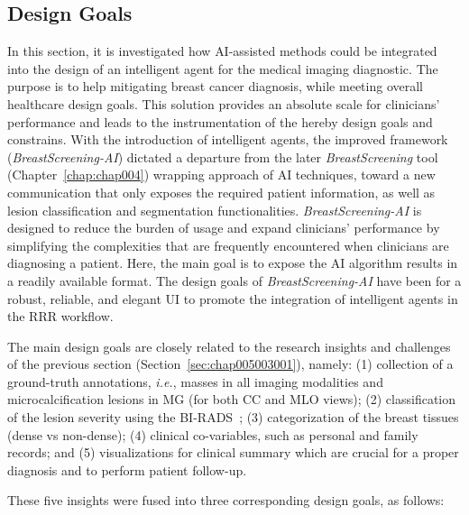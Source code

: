 \subsection{Design Goals}
\label{sec:chap005003002}

In this section, it is investigated how \ac{AI}-assisted methods could be integrated into the design of an intelligent agent for the medical imaging diagnostic.
The purpose is to help mitigating breast cancer diagnosis, while meeting overall healthcare design goals.
This solution provides an absolute scale for clinicians' performance and leads to the instrumentation of the hereby design goals and constrains.
With the introduction of intelligent agents, the improved framework ({\it BreastScreening-AI}) dictated a departure from the later {\it BreastScreening} tool (Chapter~\ref{chap:chap004}) wrapping approach of \ac{AI} techniques, toward a new communication that only exposes the required patient information, as well as lesion classification and segmentation functionalities.
{\it BreastScreening-AI} is designed to reduce the burden of usage and expand clinicians' performance by simplifying the complexities that are frequently encountered when clinicians are diagnosing a patient.
Here, the main goal is to expose the \ac{AI} algorithm results in a readily available format.
The design goals of {\it BreastScreening-AI} have been for a robust, reliable, and elegant \ac{UI} to promote the integration of intelligent agents in the \ac{RRR} workflow.

The main design goals are closely related to the research insights and challenges of the previous section (Section~\ref{sec:chap005003001}), namely:
(1) collection of a ground-truth annotations, {\it i.e.}, masses in all imaging modalities and microcalcification lesions in \ac{MG} (for both \ac{CC} and \ac{MLO} views);
(2) classification of the lesion severity using the \ac{BI-RADS}~\cite{aghaei2018association};
(3) categorization of the breast tissues (dense vs non-dense);
(4) clinical co-variables, such as personal and family records; and
(5) visualizations for clinical summary which are crucial for a proper diagnosis and to perform patient follow-up.

\hfill

\noindent
These five insights were fused into three corresponding design goals, as follows:

